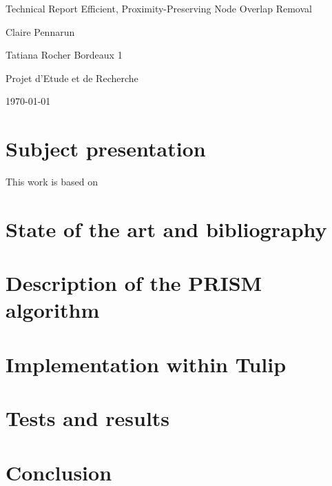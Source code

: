 \documentclass[12pt]{report}
\begin{document}
\begin{titlepage}
\begin{center}

\hfill

\bigskip
\huge{Technical Report} 
\vfill
\bigskip 
\Huge 
\bigskip Efficient, Proximity-Preserving Node Overlap Removal \par 
\vfill
\Large Claire Pennarun \par 
		Tatiana Rocher
\vfill
\Large Bordeaux 1 \par \Large Projet d'Etude et de Recherche		
		\bigskip 
\bigskip

\Large
\today
\end{center}
\end{titlepage}

\tableofcontents
\newpage

\chapter{Subject presentation}

This work is based on \cite{GH08}

\chapter{State of the art and bibliography}

\chapter{Description of the PRISM algorithm}

\chapter{Implementation within Tulip}

\chapter{Tests and results}

\chapter{Conclusion}



\end{document}
